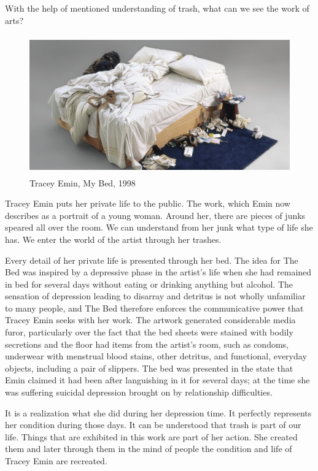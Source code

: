 With the help of mentioned understanding of trash, what can we see the work of arts?

\begin{figure}[h!]
  \centering
  \includegraphics[height=6cm]{graphics/tracey-emin-my-bed.jpg}
  \caption{Tracey Emin, My Bed, 1998}
  \label{fig:TraceyEmin_MyBed}
\end{figure}

Tracey Emin puts her private life to the public. The work, which Emin now describes as a portrait of a young woman. Around her, there are pieces of junks speared all over the room. We can understand from her junk what type of life she has. We enter the world of the artist through her trashes.

Every detail of her private life is presented through her bed. The idea for The Bed was inspired by a depressive phase in the artist’s life when she had remained in bed for several days without eating or drinking anything but alcohol. The sensation of depression leading to disarray and detritus is not wholly unfamiliar to many people, and The Bed therefore enforces the communicative power that Tracey Emin seeks with her work. The artwork generated considerable media furor, particularly over the fact that the bed sheets were stained with bodily secretions and the floor had items from the artist's room, such as condoms, underwear with menstrual blood stains, other detritus, and functional, everyday objects, including a pair of slippers. The bed was presented in the state that Emin claimed it had been after languishing in it for several days; at the time she was suffering suicidal depression brought on by relationship difficulties.

It is a realization what she did during her depression time. It perfectly represents her condition during those days. It can be understood that trash is part of our life. Things that are exhibited in this work are part of her action. She created them and later through them in the mind of people the condition and life of Tracey Emin are recreated. 

